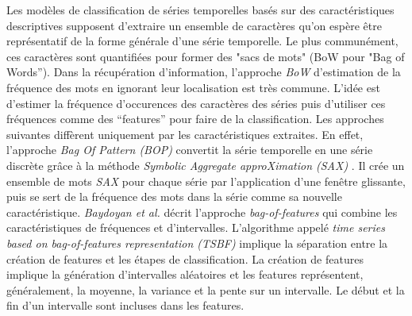 Les mod\`eles de classification de s\'eries temporelles bas\'es sur des caract\'eristiques
descriptives  supposent  d'extraire  un  ensemble  de  caract\`eres qu'on  esp\`ere  \^etre
repr\'esentatif de la forme g\'en\'erale d'une s\'erie temporelle. Le plus commun\'ement,
ces caract\`eres sont quantifi\'ees pour former des "sacs de mots" (BoW pour "Bag of Words'').
Dans la r\'ecup\'eration d'information, l'approche {\em BoW} d'estimation de la fr\'equence des mots en ignorant leur localisation est tr\`es commune. L'id\'ee est d'estimer la fr\'equence d'occurences des caract\`eres des s\'eries puis  d'utiliser ces fr\'equences comme des ``features'' pour faire de la  classification.
\newline
Les approches suivantes diff\`erent uniquement par les caract\'eristiques extraites.
En effet, l'approche {\em Bag Of Pattern (BOP)} \cite{lin2012rotation} convertit la s\'erie temporelle en une s\'erie discr\`ete gr\^ace \`a la m\'ethode {\em Symbolic Aggregate approXimation (SAX)} \cite{lin2007experiencing}. Il cr\'ee un ensemble de mots {\em SAX} pour chaque s\'erie par l'application d'une fen\^etre glissante, puis se sert de la fr\'equence des mots dans la s\'erie comme sa nouvelle caract\'eristique. 
{\em Baydoyan et al.} \cite{baydogan2013bag} d\'ecrit l'approche {\em bag-of-features} qui combine les caract\'eristiques de fr\'equences et d'intervalles. L'algorithme appel\'e {\em time series based on bag-of-features representation (TSBF)} implique la s\'eparation entre la cr\'eation de features et les \'etapes de classification. 
La cr\'eation de features implique la g\'en\'eration d'intervalles al\'eatoires et les features repr\'esentent, g\'en\'eralement, la moyenne, la variance et la pente sur un intervalle. 
Le d\'ebut et la fin d'un intervalle sont incluses dans les features. 